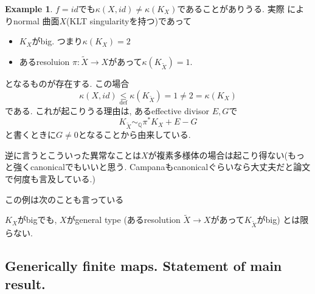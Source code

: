 \documentclass[dvipdfmx,a4paper,11pt]{article} %
\theoremstyle{definition}
\newtheorem{ex}[thm]{Example}
\theoremstyle{remark}
\numberwithin{equation}{section}
\newcommand{\Q}{\mathbb{Q}}
\begin{document}
\begin{ex}
$f = id$でも$\kappa(X, id) \neq \kappa(K_X)$であることがありうる. 
実際 \cite{Keum08}によりnormal 曲面$X$(KLT singularityを持つ)であって
\begin{itemize}
\item $K_X$がbig. つまり$\kappa(K_X)=2$
\item あるresoluion $\pi : \widetilde{X} \to X$があって$\kappa(K_{\widetilde{X}}) = 1$.
\end{itemize}
となるものが存在する. 
この場合
$$
\kappa(X, id) \underset{\text{def}}{\le} \kappa(K_{\widetilde{X}})  = 1 \neq 2 = \kappa(K_X)
$$
である. 
これが起こりうる理由は, あるeffective divisor $E, G$で
$$
K_{\widetilde{X}} \sim_{\Q} \pi^{*}K_X + E-G
$$
と書くときに$G \neq 0$となることから由来している. 

逆に言うとこういった異常なことは$X$が複素多様体の場合は起こり得ない(もっと強くcanonicalでもいいと思う. Campanaもcanonicalぐらいなら大丈夫だと論文で何度も言及している.)

この例は次のことも言っている
\begin{center}
$K_X$がbigでも, $X$がgeneral type (あるresolution $\widetilde{X}\to X$があって$K_{\widetilde{X}}$がbig) とは限らない.
\end{center}

\end{ex}

\subsection{Generically finite maps. Statement of main result. \cite[1.3.2]{Cam04}}
\end{document}
